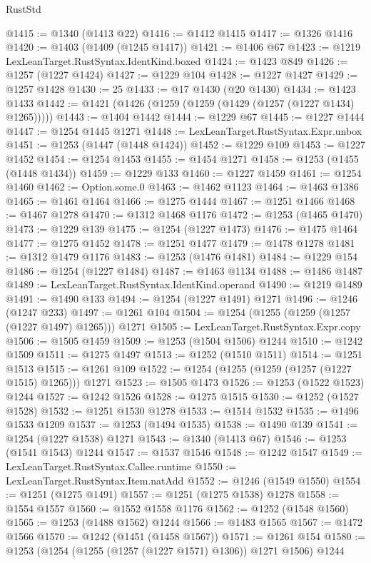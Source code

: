 \begin{lexlean}{RustStd}
\begin{coremodule}
@1415 := @1340 (@1413 @22)
@1416 := @1412 @1415
@1417 := @1326 @1416
@1420 := @1403 (@1409 (@1245 @1417))
@1421 := @1406 @67
@1423 := @1219 LexLeanTarget.RustSyntax.IdentKind.boxed
@1424 := @1423 @849
@1426 := @1257 (@1227 @1424)
@1427 := @1229 @104
@1428 := @1227 @1427
@1429 := @1257 @1428
@1430 := 25
@1433 := @17 @1430 (@20 @1430)
@1434 := @1423 @1433
@1442 := @1421 (@1426 (@1259 (@1259 (@1429 (@1257 (@1227 @1434) @1265)))))
@1443 := @1404 @1442
@1444 := @1229 @67
@1445 := @1227 @1444
@1447 := @1254 @1445 @1271
@1448 := LexLeanTarget.RustSyntax.Expr.unbox
@1451 := @1253 (@1447 (@1448 @1424))
@1452 := @1229 @109
@1453 := @1227 @1452
@1454 := @1254 @1453
@1455 := @1454 @1271
@1458 := @1253 (@1455 (@1448 @1434))
@1459 := @1229 @133
@1460 := @1227 @1459
@1461 := @1254 @1460
@1462 := Option.some.{0}
@1463 := @1462 @1123
@1464 := @1463 @1386
@1465 := @1461 @1464
@1466 := @1275 @1444
@1467 := @1251 @1466
@1468 := @1467 @1278
@1470 := @1312 @1468 @1176
@1472 := @1253 (@1465 @1470)
@1473 := @1229 @139
@1475 := @1254 (@1227 @1473)
@1476 := @1475 @1464
@1477 := @1275 @1452
@1478 := @1251 @1477
@1479 := @1478 @1278
@1481 := @1312 @1479 @1176
@1483 := @1253 (@1476 @1481)
@1484 := @1229 @154
@1486 := @1254 (@1227 @1484)
@1487 := @1463 @1134
@1488 := @1486 @1487
@1489 := LexLeanTarget.RustSyntax.IdentKind.operand
@1490 := @1219 @1489
@1491 := @1490 @133
@1494 := @1254 (@1227 @1491) @1271
@1496 := @1246 (@1247 @233)
@1497 := @1261 @104
@1504 := @1254 (@1255 (@1259 (@1257 (@1227 @1497) @1265))) @1271
@1505 := LexLeanTarget.RustSyntax.Expr.copy
@1506 := @1505 @1459
@1509 := @1253 (@1504 @1506) @1244
@1510 := @1242 @1509
@1511 := @1275 @1497
@1513 := @1252 (@1510 @1511)
@1514 := @1251 @1513
@1515 := @1261 @109
@1522 := @1254 (@1255 (@1259 (@1257 (@1227 @1515) @1265))) @1271
@1523 := @1505 @1473
@1526 := @1253 (@1522 @1523) @1244
@1527 := @1242 @1526
@1528 := @1275 @1515
@1530 := @1252 (@1527 @1528)
@1532 := @1251 @1530 @1278
@1533 := @1514 @1532
@1535 := @1496 @1533 @1209
@1537 := @1253 (@1494 @1535)
@1538 := @1490 @139
@1541 := @1254 (@1227 @1538) @1271
@1543 := @1340 (@1413 @67)
@1546 := @1253 (@1541 @1543) @1244
@1547 := @1537 @1546
@1548 := @1242 @1547
@1549 := LexLeanTarget.RustSyntax.Callee.runtime
@1550 := LexLeanTarget.RustSyntax.Item.natAdd
@1552 := @1246 (@1549 @1550)
@1554 := @1251 (@1275 @1491)
@1557 := @1251 (@1275 @1538) @1278
@1558 := @1554 @1557
@1560 := @1552 @1558 @1176
@1562 := @1252 (@1548 @1560)
@1565 := @1253 (@1488 @1562) @1244
@1566 := @1483 @1565
@1567 := @1472 @1566
@1570 := @1242 (@1451 (@1458 @1567))
@1571 := @1261 @154
@1580 := @1253 (@1254 (@1255 (@1257 (@1227 @1571) @1306)) @1271 @1506) @1244

\end{coremodule}
\end{lexlean}
